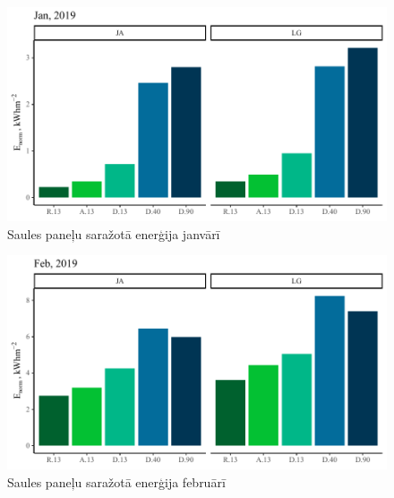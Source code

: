 \begin{figure}[h]
    \centering
    \includegraphics[width=\linewidth]{figures/sol_month/jan_m_m2.pdf}
    \caption{Saules paneļu saražotā enerģija janvārī}
    \label{fig:jan_sum}
\end{figure}

\begin{figure}[h]
    \centering
    \includegraphics[width=\linewidth]{figures/sol_month/feb_m_m2.pdf}
    \caption{Saules paneļu saražotā enerģija februārī}
    \label{fig:feb_sum}
\end{figure}


